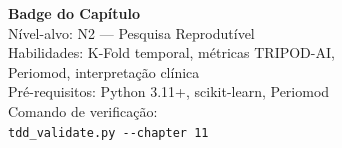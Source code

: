 \vfill

\begin{highlight}
\centering\small
\textbf{Badge do Capítulo}\\[4pt]
Nível-alvo: N2 --- Pesquisa Reprodutível\\
Habilidades: K-Fold temporal, métricas TRIPOD-AI,\\
\hspace*{4.5em}Periomod, interpretação clínica\\
Pré-requisitos: Python 3.11+, scikit-learn, Periomod\\
Comando de verificação:\\
\verb|tdd_validate.py --chapter 11|
\end{highlight}
